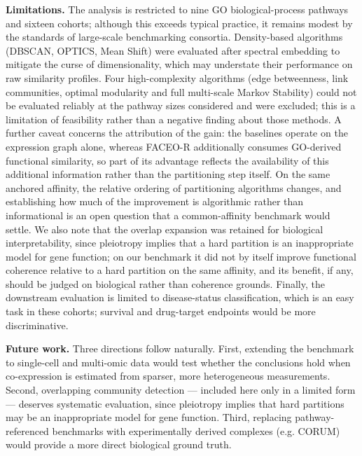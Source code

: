 \documentclass[twocolumn,10pt,a4paper]{article}
\begin{document}
\noindent\textbf{Limitations.} The analysis is restricted to nine GO biological-process pathways and sixteen cohorts;
although this exceeds typical practice, it remains modest by the standards of large-scale
benchmarking consortia. Density-based algorithms (DBSCAN, OPTICS, Mean Shift) were evaluated
after spectral embedding to mitigate the curse of dimensionality, which may understate their
performance on raw similarity profiles. Four high-complexity algorithms (edge betweenness,
link communities, optimal modularity and full multi-scale Markov Stability) could not be
evaluated reliably at the pathway sizes considered and were excluded; this is a limitation of
feasibility rather than a negative finding about those methods. A further caveat concerns the
attribution of the gain: the baselines operate on the expression graph alone, whereas FACEO-R
additionally consumes GO-derived functional similarity, so part of its advantage reflects the
availability of this additional information rather than the partitioning step itself. On the
same anchored affinity, the relative ordering of partitioning algorithms changes, and
establishing how much of the improvement is algorithmic rather than informational is an open
question that a common-affinity benchmark would settle. We also note that the overlap
expansion was retained for biological interpretability, since pleiotropy implies that a hard
partition is an inappropriate model for gene function; on our benchmark it did not by itself
improve functional coherence relative to a hard partition on the same affinity, and its
benefit, if any, should be judged on biological rather than coherence grounds. Finally, the downstream
evaluation is limited to disease-status classification, which is an easy task in these
cohorts; survival and drug-target endpoints would be more discriminative.

\noindent\textbf{Future work.} Three directions follow naturally. First, extending the benchmark to single-cell and
multi-omic data would test whether the conclusions hold when co-expression is estimated from
sparser, more heterogeneous measurements. Second, overlapping community detection ---
included here only in a limited form --- deserves systematic evaluation, since pleiotropy
implies that hard partitions may be an inappropriate model for gene function. Third,
replacing pathway-referenced benchmarks with experimentally derived complexes (e.g. CORUM)
would provide a more direct biological ground truth.

\end{document}
